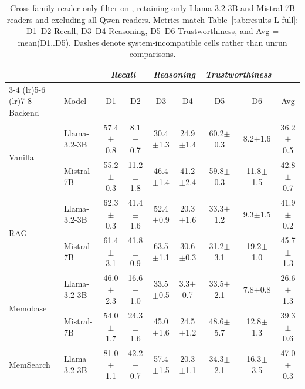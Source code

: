 \begin{table}[t]
\centering
\caption{Cross-family reader-only filter on \benchL{}, retaining only Llama-3.2-3B and Mistral-7B readers and excluding all Qwen readers. Metrics match Table~\ref{tab:results-L-full}: D1--D2 Recall, D3--D4 Reasoning, D5--D6 Trustworthiness, and Avg = mean(D1..D5). Dashes denote system-incompatible cells rather than unrun comparisons.}
\label{tab:cross-family-readers}
\scriptsize
\setlength{\tabcolsep}{3pt}
\begin{tabular}{@{}ll cccccc c@{}}
\toprule
& & \multicolumn{2}{c}{\textit{Recall}} & \multicolumn{2}{c}{\textit{Reasoning}} & \multicolumn{2}{c}{\textit{Trustworthiness}} & \\
\cmidrule(lr){3-4} \cmidrule(lr){5-6} \cmidrule(lr){7-8}
Backend & Model & D1 & D2 & D3 & D4 & D5 & D6 & Avg \\
\midrule
\multirow{2}{*}{Vanilla}
  & Llama-3.2-3B   & 57.4{\scriptsize$\pm$0.8} & 8.1{\scriptsize$\pm$0.7} & 30.4{\scriptsize$\pm$1.3} & 24.9{\scriptsize$\pm$1.4} & 60.2{\scriptsize$\pm$0.3} & 8.2{\scriptsize$\pm$1.6} & 36.2{\scriptsize$\pm$0.5} \\

  & Mistral-7B     & 55.2{\scriptsize$\pm$0.3} & 11.2{\scriptsize$\pm$1.8} & 46.4{\scriptsize$\pm$1.4} & 41.2{\scriptsize$\pm$2.4} & 59.8{\scriptsize$\pm$0.3} & 11.8{\scriptsize$\pm$1.5} & 42.8{\scriptsize$\pm$0.7} \\
\midrule
\multirow{2}{*}{RAG}
  & Llama-3.2-3B   & 62.3{\scriptsize$\pm$0.3} & 41.4{\scriptsize$\pm$1.6} & 52.4{\scriptsize$\pm$0.9} & 20.3{\scriptsize$\pm$1.6} & 33.3{\scriptsize$\pm$1.2} & 9.3{\scriptsize$\pm$1.5} & 41.9{\scriptsize$\pm$0.2} \\

  & Mistral-7B     & 61.4{\scriptsize$\pm$3.1} & 41.8{\scriptsize$\pm$0.9} & 63.5{\scriptsize$\pm$1.1} & 30.6{\scriptsize$\pm$0.3} & 31.2{\scriptsize$\pm$3.1} & 19.2{\scriptsize$\pm$1.0} & 45.7{\scriptsize$\pm$1.3} \\
\midrule
\multirow{2}{*}{Memobase}
  & Llama-3.2-3B   & 46.0{\scriptsize$\pm$2.3} & 16.6{\scriptsize$\pm$1.0} & 33.5{\scriptsize$\pm$0.5} & 3.3{\scriptsize$\pm$0.7} & 33.5{\scriptsize$\pm$2.1} & 7.8{\scriptsize$\pm$0.8} & 26.6{\scriptsize$\pm$1.3} \\

  & Mistral-7B     & 54.0{\scriptsize$\pm$1.7} & 24.3{\scriptsize$\pm$1.6} & 45.0{\scriptsize$\pm$1.6} & 24.5{\scriptsize$\pm$1.2} & 48.6{\scriptsize$\pm$5.7} & 12.8{\scriptsize$\pm$1.3} & 39.3{\scriptsize$\pm$0.6} \\
\midrule
\multirow{2}{*}{MemSearch}
  & Llama-3.2-3B   & 81.0{\scriptsize$\pm$1.1} & 42.2{\scriptsize$\pm$0.7} & 57.4{\scriptsize$\pm$1.5} & 20.3{\scriptsize$\pm$1.1} & 34.3{\scriptsize$\pm$2.1} & 16.3{\scriptsize$\pm$3.5} & 47.0{\scriptsize$\pm$0.3} \\


\end{tabular}
\end{table}
